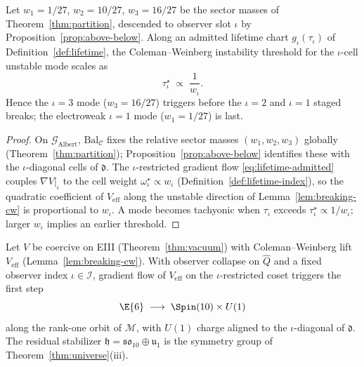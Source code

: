\begin{lemma}
\label{lem:breaking-capacity-order}
Let $w_1=1/27$, $w_2=10/27$, $w_3=16/27$ be the sector masses of
Theorem~\ref{thm:partition}, descended to observer slot $\iota$ by
Proposition~\ref{prop:above-below}. Along an admitted lifetime chart
$g_\iota(\tau_\iota)$ of Definition~\ref{def:lifetime}, the Coleman--Weinberg
instability threshold for the $\iota$-cell unstable mode scales as
\begin{equation}\label{eq:breaking-threshold}
  \tau_\iota^\star \;\propto\; \frac{1}{w_\iota}.
\end{equation}
Hence the $\iota=3$ mode ($w_3=16/27$) triggers before the $\iota=2$ and
$\iota=1$ staged breaks; the electroweak $\iota=1$ mode ($w_1=1/27$) is last.
\end{lemma}

\begin{proof}
On $\mathcal{G}_{\mathrm{Albert}}$, $\mathrm{Bal}_{\mathcal{C}}$ fixes the
relative sector masses $(w_1,w_2,w_3)$ globally (Theorem~\ref{thm:partition});
Proposition~\ref{prop:above-below} identifies these with the $\iota$-diagonal
cells of $\mathfrak{d}$. The $\iota$-restricted gradient flow
\eqref{eq:lifetime-admitted} couples $\nabla V|_\iota$ to the cell weight
$\omega^\star_\iota\propto w_\iota$ (Definition~\ref{def:lifetime-index}), so
the quadratic coefficient of $V_{\mathrm{eff}}$ along the unstable direction
of Lemma~\ref{lem:breaking-cw} is proportional to $w_\iota$. A mode becomes
tachyonic when $\tau_\iota$ exceeds $\tau_\iota^\star\propto 1/w_\iota$; larger
$w_\iota$ implies an earlier threshold.
\end{proof}

\begin{theorem}\label{thm:breaking-e6so10}
Let $V$ be coercive on EIII (Theorem~\ref{thm:vacuum}) with Coleman--Weinberg
lift $V_{\mathrm{eff}}$ (Lemma~\ref{lem:breaking-cw}). With observer collapse on
$\hat Q$ and a fixed observer index $\iota\in\mathcal{I}$, gradient flow of
$V_{\mathrm{eff}}$ on the $\iota$-restricted coset triggers the first step
\begin{equation}\label{eq:breaking-e6so10}
  \E{6}\;\longrightarrow\; \Spin(10)\times U(1)
\end{equation}
along the rank-one orbit of $\mathcal{M}$, with $U(1)$ charge aligned to the
$\iota$-diagonal of $\mathfrak{d}$. The residual stabilizer
$\mathfrak{h}=\mathfrak{so}_{10}\oplus\mathfrak{u}_1$ is the symmetry group of
Theorem~\ref{thm:universe}(iii).
\end{theorem}

